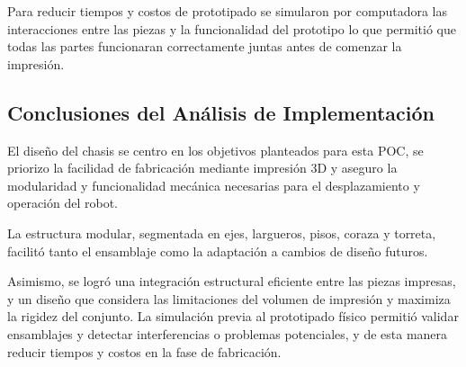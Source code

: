 Para reducir tiempos y costos de prototipado se simularon por computadora las interacciones entre las piezas y la funcionalidad del prototipo lo que permitió que todas las partes funcionaran correctamente juntas antes de comenzar la impresión.

\subsection{Conclusiones del Análisis de Implementación}

El diseño del chasis se centro en los objetivos planteados para esta POC, se priorizo la facilidad de fabricación mediante impresión 3D y aseguro la modularidad y funcionalidad mecánica necesarias para el desplazamiento y operación del robot.

La estructura modular, segmentada en ejes, largueros, pisos, coraza y torreta, facilitó tanto el ensamblaje como la adaptación a cambios de diseño futuros.

Asimismo, se logró una integración estructural eficiente entre las piezas impresas, y un diseño que considera las limitaciones del volumen de impresión y maximiza la rigidez del conjunto. La simulación previa al prototipado físico permitió validar ensamblajes y detectar interferencias o problemas potenciales, y de esta manera reducir tiempos y costos en la fase de fabricación.